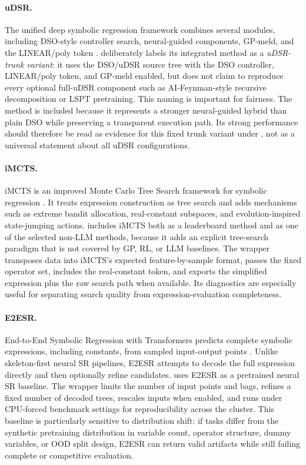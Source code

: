 \paragraph{uDSR.}
The unified deep symbolic regression framework combines several modules, including DSO-style controller search, neural-guided components, GP-meld, and the LINEAR/poly token \citep{landajuela2022unified}. \arena{} deliberately labels its integrated method as a \emph{uDSR-trunk variant}: it uses the DSO/uDSR source tree with the DSO controller, LINEAR/poly token, and GP-meld enabled, but does not claim to reproduce every optional full-uDSR component such as AI-Feynman-style recursive decomposition or LSPT pretraining. This naming is important for fairness. The method is included because it represents a stronger neural-guided hybrid than plain DSO while preserving a transparent execution path. Its strong \core{} performance should therefore be read as evidence for this fixed trunk variant under \arena{}, not as a universal statement about all uDSR configurations.

\paragraph{iMCTS.}
iMCTS is an improved Monte Carlo Tree Search framework for symbolic regression \citep{huang2025imcts}. It treats expression construction as tree search and adds mechanisms such as extreme bandit allocation, real-constant subspaces, and evolution-inspired state-jumping actions. \arena{} includes iMCTS both as a leaderboard method and as one of the selected non-LLM \probe{} methods, because it adds an explicit tree-search paradigm that is not covered by GP, RL, or LLM baselines. The wrapper transposes data into iMCTS's expected feature-by-sample format, passes the fixed operator set, includes the real-constant token, and exports the simplified expression plus the raw search path when available. Its diagnostics are especially useful for separating search quality from expression-evaluation completeness.

\paragraph{E2ESR.}
End-to-End Symbolic Regression with Transformers predicts complete symbolic expressions, including constants, from sampled input-output points \citep{kamienny2022end}. Unlike skeleton-first neural SR pipelines, E2ESR attempts to decode the full expression directly and then optionally refine candidates. \arena{} uses E2ESR as a pretrained neural SR baseline. The wrapper limits the number of input points and bags, refines a fixed number of decoded trees, rescales inputs when enabled, and runs under CPU-forced benchmark settings for reproducibility across the cluster. This baseline is particularly sensitive to distribution shift: if \core{} tasks differ from the synthetic pretraining distribution in variable count, operator structure, dummy variables, or OOD split design, E2ESR can return valid artifacts while still failing complete or competitive evaluation.

